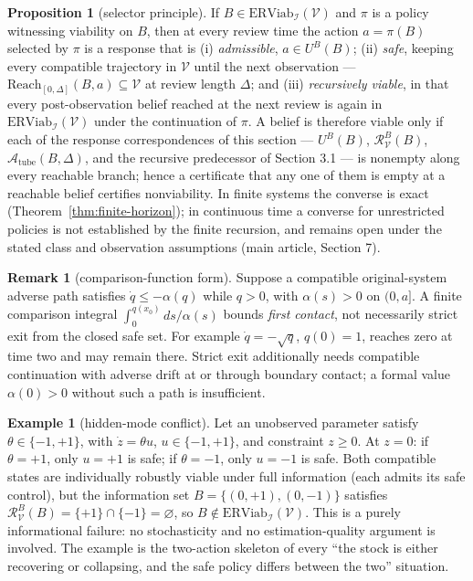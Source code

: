 \documentclass[11pt]{article}
\theoremstyle{definition}
\newtheorem{proposition}{Proposition}
\newtheorem{remark}{Remark}
\newtheorem{example}{Example}
\begin{document}
\begin{proposition}[selector principle]\label{prop:selector}
If \(B\in\mathrm{ERViab}_{\mathcal{I}}(\mathcal{V})\) and \(\pi\) is a
policy witnessing viability on \(B\), then at every review time the
action \(a=\pi(B)\) selected by \(\pi\) is a response that is
(i) \emph{admissible}, \(a\in U^B(B)\); (ii) \emph{safe}, keeping every
compatible trajectory in \(\mathcal{V}\) until the next observation ---
\(\mathrm{Reach}_{[0,\Delta]}(B,a)\subseteq\mathcal{V}\) at review
length \(\Delta\); and (iii) \emph{recursively viable}, in that every
post-observation belief reached at the next review is again in
\(\mathrm{ERViab}_{\mathcal{I}}(\mathcal{V})\) under the continuation
of \(\pi\). A belief is therefore viable only if each of the response
correspondences of this section --- \(U^B(B)\),
\(\mathcal{R}_{\mathcal{V}}^B(B)\), \(\mathcal{A}_{\mathrm{tube}}(B,\Delta)\),
and the recursive predecessor of Section 3.1 --- is nonempty along
every reachable branch; hence a certificate that any one of them is
empty at a reachable belief certifies nonviability. In finite systems
the converse is exact (Theorem~\ref{thm:finite-horizon}); in continuous time a converse for unrestricted policies is not established by the finite recursion, and remains open under the stated class and observation assumptions (main article, Section 7).
\end{proposition}

\begin{remark}[comparison-function form]\label{rem:comparison}
Suppose a compatible original-system adverse path satisfies \(\dot q\le-\alpha(q)\) while \(q>0\), with \(\alpha(s)>0\) on \((0,a]\). A finite comparison integral \(\int_0^{q(x_0)}ds/\alpha(s)\) bounds \emph{first contact}, not necessarily strict exit from the closed safe set. For example \(\dot q=-\sqrt q\), \(q(0)=1\), reaches zero at time two and may remain there. Strict exit additionally needs compatible continuation with adverse drift at or through boundary contact; a formal value \(\alpha(0)>0\) without such a path is insufficient.
\end{remark}

\begin{example}[hidden-mode conflict]\label{ex:hidden-mode} Let an unobserved parameter satisfy
\(\theta \in \{-1, +1\}\), with \(\dot z = \theta u\),
\(u \in \{-1, +1\}\), and constraint \(z \ge 0\). At \(z = 0\): if
\(\theta = +1\), only \(u = +1\) is safe; if \(\theta = -1\), only
\(u = -1\) is safe. Both compatible states are individually robustly
viable under full information (each admits its safe control), but the
information set \(B = \{(0, +1), (0, -1)\}\) satisfies
\(\mathcal{R}_{\mathcal{V}}^B(B) = \{+1\} \cap \{-1\} = \varnothing\),
so \(B \notin \mathrm{ERViab}_{\mathcal{I}}(\mathcal{V})\). This is a
purely informational failure: no stochasticity and no estimation-quality
argument is involved. The example is the two-action skeleton of every
``the stock is either recovering or collapsing, and the safe policy
differs between the two'' situation.

\end{example}
\end{document}
